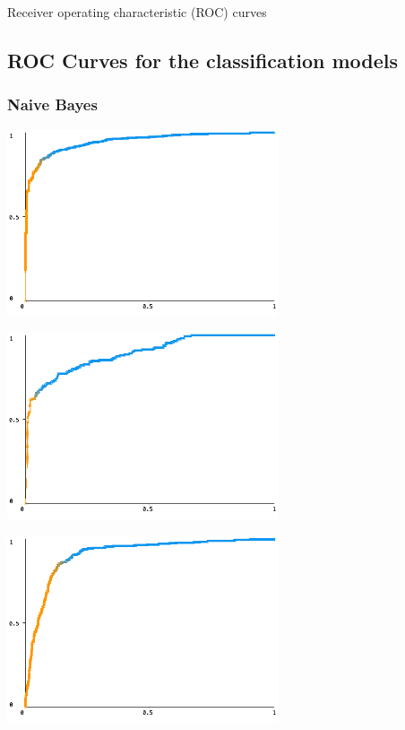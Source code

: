 \documentclass[12pt]{article}
\begin{document}
\begin{section}{Receiver operating characteristic (ROC) curves}
 \subsection{ROC Curves for the classification models}
 \subsubsection{Naive Bayes}

 \begin{center}
     \begin{minipage}{0.48\linewidth}
         \includegraphics[width=8cm]{images/3_1_naive_bayes_normal.png}
     \end{minipage}
     \begin{minipage}{0.48\linewidth}
         \includegraphics[width=8cm]{images/3_1_naive_bayes_pathological.png}
     \end{minipage}
     \begin{minipage}{0.48\linewidth}
         \includegraphics[width=8cm]{images/3_1_naive_bayes_suspect.png}
     \end{minipage}
 \end{center}


\end{section}
\end{document}
